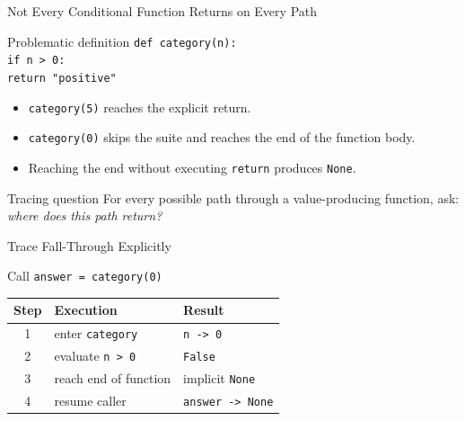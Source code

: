 \documentclass[aspectratio=169,10pt]{beamer}
\begin{document}

\begin{frame}{Not Every Conditional Function Returns on Every Path}
  \begin{block}{Problematic definition}
    \texttt{def category(n):}\\
    \hspace*{0.20in}\texttt{if n > 0:}\\
    \hspace*{0.40in}\texttt{return "positive"}
  \end{block}

  \begin{itemize}
    \item \texttt{category(5)} reaches the explicit return.
    \item \texttt{category(0)} skips the suite and reaches the end of the function body.
    \item Reaching the end without executing \texttt{return} produces \texttt{None}.
  \end{itemize}

  \begin{alertblock}{Tracing question}
    For every possible path through a value-producing function, ask: \emph{where does this path return?}
  \end{alertblock}
\end{frame}

\begin{frame}{Trace Fall-Through Explicitly}
  \begin{block}{Call}
    \centering
    \Large\texttt{answer = category(0)}
  \end{block}

  \begin{center}
    \renewcommand{\arraystretch}{1.18}
    \begin{tabular}{c|l|l}
      \textbf{Step} & \textbf{Execution} & \textbf{Result} \\\hline
      1 & enter \texttt{category} & \texttt{n -> 0} \\
      2 & evaluate \texttt{n > 0} & \texttt{False} \\
      3 & reach end of function & implicit \texttt{None} \\
      4 & resume caller & \texttt{answer -> None}
    \end{tabular}
  \end{center}
\end{frame}
\end{document}
